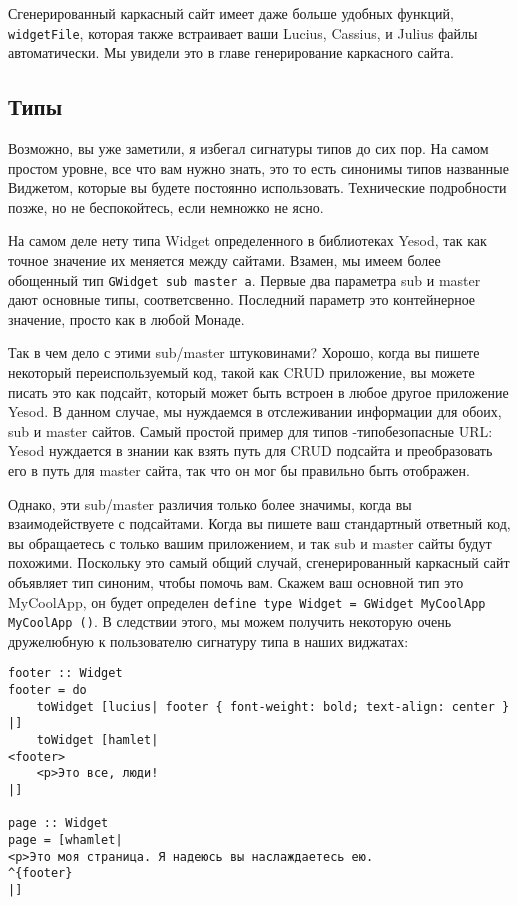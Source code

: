 Сгенерированный каркасный сайт имеет даже больше удобных функций, \lstinline'widgetFile', которая также встраивает ваши Lucius, Cassius, и Julius файлы автоматически. Мы увидели это в главе генерирование каркасного сайта. %

\subsection{Типы}

Возможно, вы уже заметили, я избегал сигнатуры типов до сих пор. На самом простом уровне, все что вам нужно знать, это то есть синонимы типов названные Виджетом, которые вы будете постоянно использовать. Технические подробности позже, но не беспокойтесь, если немножко не ясно.

На самом деле нету типа Widget определенного в библиотеках Yesod, так как точное значение их меняется между сайтами. Взамен, мы имеем более обощенный тип \lstinline'GWidget sub master a'. Первые два параметра sub и master дают основные типы, соответсвенно. Последний параметр это контейнерное значение, просто как в любой Монаде.

Так в чем дело с этими sub/master штуковинами? Хорошо, когда вы пишете некоторый переиспользуемый код, такой как CRUD приложение, вы можете писать это как подсайт, который может быть встроен в любое другое приложение Yesod. В данном случае, мы нуждаемся в отслеживании информации для обоих, sub и master сайтов. Самый простой пример для типов -типобезопасные URL: Yesod нуждается в знании как взять путь для CRUD подсайта и преобразовать его в путь для master сайта, так что он мог бы правильно быть отображен.

Однако, эти sub/master различия только более значимы, когда вы взаимодействуете с подсайтами. Когда вы пишете ваш стандартный ответный код, вы обращаетесь с только вашим приложением, и так sub и master сайты будут похожими. Поскольку это самый общий случай, сгенерированный каркасный сайт объявляет тип синоним, чтобы помочь вам. Скажем ваш основной тип это MyCoolApp, он будет определен \lstinline'define type Widget = GWidget MyCoolApp MyCoolApp ()'. В следствии этого, мы можем получить некоторую очень дружелюбную к пользователю сигнатуру типа в наших виджатах:

\begin{lstlisting}
footer :: Widget
footer = do
    toWidget [lucius| footer { font-weight: bold; text-align: center } |]
    toWidget [hamlet|
<footer>
    <p>Это все, люди!
|]

page :: Widget
page = [whamlet|
<p>Это моя страница. Я надеюсь вы наслаждаетесь ею.
^{footer}
|]
\end{lstlisting}


